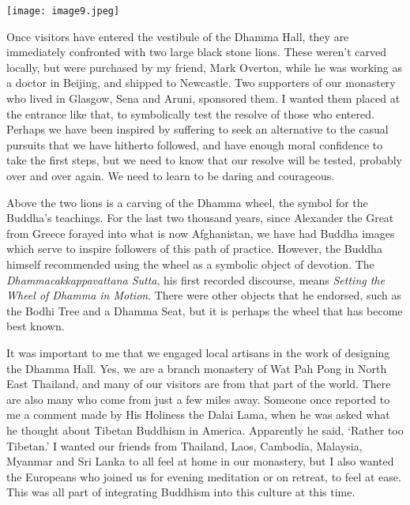 \texttt{[image: image9.jpeg]}

Once visitors have entered the vestibule of the Dhamma Hall, they are
immediately confronted with two large black stone lions. These weren't
carved locally, but were purchased by my friend, Mark Overton, while he
was working as a doctor in Beijing, and shipped to Newcastle. Two
supporters of our monastery who lived in Glasgow, Sena and Aruni,
sponsored them. I wanted them placed at the entrance like that, to
symbolically test the resolve of those who entered. Perhaps we have been
inspired by suffering to seek an alternative to the casual pursuits that
we have hitherto followed, and have enough moral confidence to take the
first steps, but we need to know that our resolve will be tested,
probably over and over again. We need to learn to be daring and
courageous.

Above the two lions is a carving of the Dhamma wheel, the symbol for the
Buddha's teachings. For the last two thousand years, since Alexander the
Great from Greece\cite{greco} forayed into what is now Afghanistan, we have had Buddha
images which serve to inspire followers of this path of practice.
However, the Buddha himself recommended using the wheel as a symbolic
object of devotion. The \emph{Dhammacakkappavattana Sutta}, his first
recorded discourse, means \emph{Setting the Wheel of Dhamma in Motion}\cite{cakka}.
There were other objects that
he endorsed, such as the Bodhi Tree and a Dhamma Seat, but it is perhaps
the wheel that has become best known.

It was important to me that we engaged local artisans in the work of
designing the Dhamma Hall. Yes, we are a branch monastery of Wat Pah
Pong in North East Thailand, and many of our visitors are from that part
of the world. There are also many who come from just a few miles away.
Someone once reported to me a comment made by His Holiness the Dalai
Lama, when he was asked what he thought about Tibetan Buddhism in
America. Apparently he said, `Rather too Tibetan.' I wanted our friends
from Thailand, Laos, Cambodia, Malaysia, Myanmar and Sri Lanka to all
feel at home in our monastery, but I also wanted the Europeans who
joined us for evening meditation or on retreat, to feel at ease. This
was all part of integrating Buddhism into this culture at this time.


